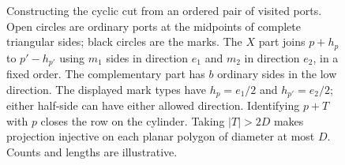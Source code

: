\begin{figure}[htbp]
\caption{Constructing the cyclic cut from an ordered pair of visited
ports. Open circles are ordinary ports at the midpoints of complete
triangular sides; black circles are the marks. The $X$ part joins
$p+h_p$ to $p'-h_{p'}$ using $m_1$ sides in direction $e_1$ and
$m_2$ in direction $e_2$, in a fixed order. The complementary part has
$b$ ordinary sides in the low direction. The displayed mark types have
$h_p=e_1/2$ and $h_{p'}=e_2/2$; either half-side can have either
allowed direction. Identifying $p+T$ with $p$ closes the row on the
cylinder. Taking $|T|>2D$ makes projection injective on each planar
polygon of diameter at most $D$. Counts and lengths are illustrative.}
\label{fig:marked-row}
\end{figure}

